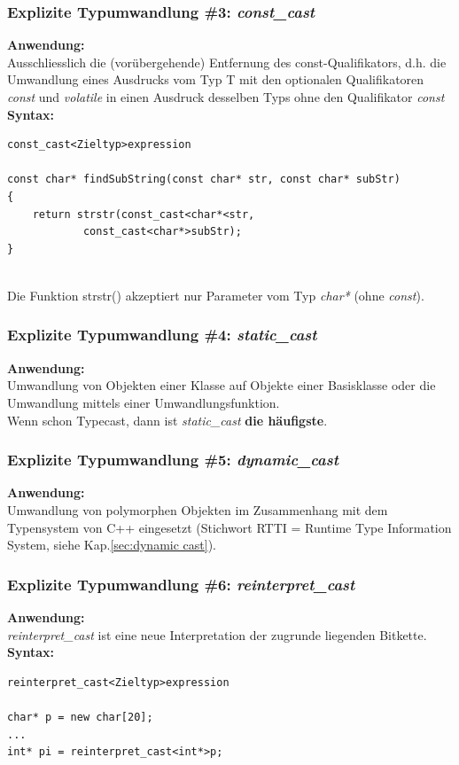 \subsubsection{Explizite Typumwandlung \#3: \emph{const\_cast}}
\textbf{Anwendung:}\\
Ausschliesslich die (vorübergehende) Entfernung des const-Qualifikators, d.h. die Umwandlung eines Ausdrucks vom Typ T mit den optionalen Qualifikatoren \emph{const} und \emph{volatile} in einen Ausdruck desselben Typs ohne den Qualifikator \emph{const}\\
\textbf{Syntax:}\\
\vspace{-\baselineskip}
\begin{minipage}{0.8\linewidth}
\begin{lstlisting}
const_cast<Zieltyp>expression

const char* findSubString(const char* str, const char* subStr)
{
	return strstr(const_cast<char*<str,
			const_cast<char*>subStr);
}
\end{lstlisting}
\end{minipage}\\
Die Funktion strstr() akzeptiert nur Parameter vom Typ \emph{char*} (ohne \emph{const}).

\subsubsection{Explizite Typumwandlung \#4: \emph{static\_cast}}
\textbf{Anwendung:}\\
Umwandlung von Objekten einer Klasse auf Objekte einer Basisklasse oder die Umwandlung mittels einer Umwandlungsfunktion.\\
Wenn schon Typecast, dann ist \emph{static\_cast} \textbf{die häufigste}.

\subsubsection{Explizite Typumwandlung \#5: \emph{dynamic\_cast}}
\textbf{Anwendung:}\\
Umwandlung von polymorphen Objekten im Zusammenhang mit dem Typensystem von C++ eingesetzt (Stichwort RTTI = Runtime Type Information System, siehe Kap.\ref{sec:dynamic cast}).

\subsubsection{Explizite Typumwandlung \#6: \emph{reinterpret\_cast}}
\textbf{Anwendung:}\\
\emph{reinterpret\_cast} ist eine neue Interpretation der zugrunde liegenden Bitkette.\\
\textbf{Syntax:}\\
\vspace{-\baselineskip}
\begin{minipage}{0.5\linewidth}
\begin{lstlisting}
reinterpret_cast<Zieltyp>expression

char* p = new char[20];
...
int* pi = reinterpret_cast<int*>p;
\end{lstlisting}
\end{minipage}


